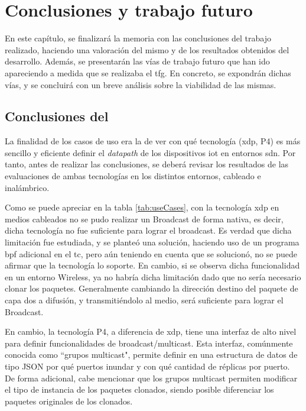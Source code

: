 \chapter{Conclusiones y trabajo futuro}
\label{conclusiones}

 En este capítulo, se finalizará la memoria con las conclusiones del trabajo realizado, haciendo una valoración del mismo y de los resultados obtenidos del desarrollo. Además, se presentarán las vías de trabajo futuro que han ido apareciendo a medida que se realizaba el \gls{tfg}. En concreto, se expondrán dichas vías, y se concluirá con un breve análisis sobre la viabilidad de las mismas.
\section{Conclusiones del }

La finalidad de los casos de uso era la de ver con qué tecnología (\gls{xdp}, P4) es más sencillo y eficiente definir el \textit{datapath} de los dispositivos \gls{iot} en entornos \gls{sdn}. Por tanto, antes de realizar las conclusiones, se deberá revisar los resultados de las evaluaciones de ambas tecnologías en los distintos entornos, cableado e inalámbrico. \\
\par
Como se puede apreciar en la tabla \ref{tab:useCases}, con la tecnología \gls{xdp} en medios cableados no se pudo realizar un Broadcast de forma nativa, es decir, dicha tecnología no fue suficiente para lograr el broadcast. Es verdad que dicha limitación fue estudiada, y se planteó una solución, haciendo uso de un programa \gls{bpf} adicional en el \gls{tc}, pero aún teniendo en cuenta que se solucionó, no se puede afirmar que la tecnología lo soporte.  En cambio, si se observa dicha funcionalidad en un entorno Wireless, ya no habría dicha limitación dado que no sería necesario clonar los paquetes. Generalmente cambiando la dirección destino del paquete de capa dos a difusión, y transmitiéndolo al medio, será suficiente para lograr el Broadcast. \\
\par



En cambio, la tecnología P4, a diferencia de \gls{xdp}, tiene una interfaz de alto nivel para definir funcionalidades de broadcast/multicast. Esta interfaz, comúnmente conocida como ``grupos multicast", permite definir en una estructura de datos de tipo JSON por qué puertos inundar y con qué cantidad de réplicas por puerto. De forma adicional, cabe mencionar que los grupos multicast permiten modificar el tipo de instancia de los paquetes clonados, siendo posible diferenciar los paquetes originales de los clonados. \\
\par

